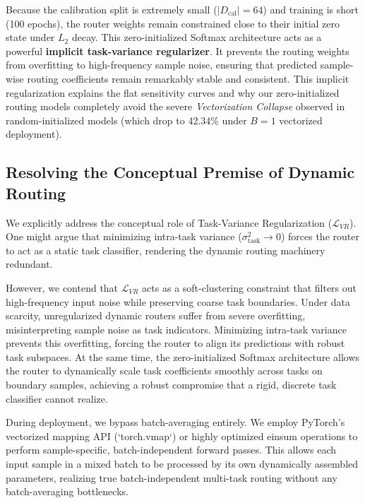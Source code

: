 Because the calibration split is extremely small ($|D_{\text{cal}}| = 64$) and training is short (100 epochs), the router weights remain constrained close to their initial zero state under $L_2$ decay. This zero-initialized Softmax architecture acts as a powerful \textbf{implicit task-variance regularizer}. It prevents the routing weights from overfitting to high-frequency sample noise, ensuring that predicted sample-wise routing coefficients remain remarkably stable and consistent. This implicit regularization explains the flat sensitivity curves and why our zero-initialized routing models completely avoid the severe \emph{Vectorization Collapse} observed in random-initialized models (which drop to 42.34\% under $B=1$ vectorized deployment).

\subsection{Resolving the Conceptual Premise of Dynamic Routing}
We explicitly address the conceptual role of Task-Variance Regularization ($\mathcal{L}_{VR}$). One might argue that minimizing intra-task variance ($\sigma^2_{\text{task}} \to 0$) forces the router to act as a static task classifier, rendering the dynamic routing machinery redundant. 

However, we contend that $\mathcal{L}_{VR}$ acts as a soft-clustering constraint that filters out high-frequency input noise while preserving coarse task boundaries. Under data scarcity, unregularized dynamic routers suffer from severe overfitting, misinterpreting sample noise as task indicators. Minimizing intra-task variance prevents this overfitting, forcing the router to align its predictions with robust task subspaces. At the same time, the zero-initialized Softmax architecture allows the router to dynamically scale task coefficients smoothly across tasks on boundary samples, achieving a robust compromise that a rigid, discrete task classifier cannot realize.

During deployment, we bypass batch-averaging entirely. We employ PyTorch's vectorized mapping API (`torch.vmap`) or highly optimized einsum operations to perform sample-specific, batch-independent forward passes. This allows each input sample in a mixed batch to be processed by its own dynamically assembled parameters, realizing true batch-independent multi-task routing without any batch-averaging bottlenecks.

